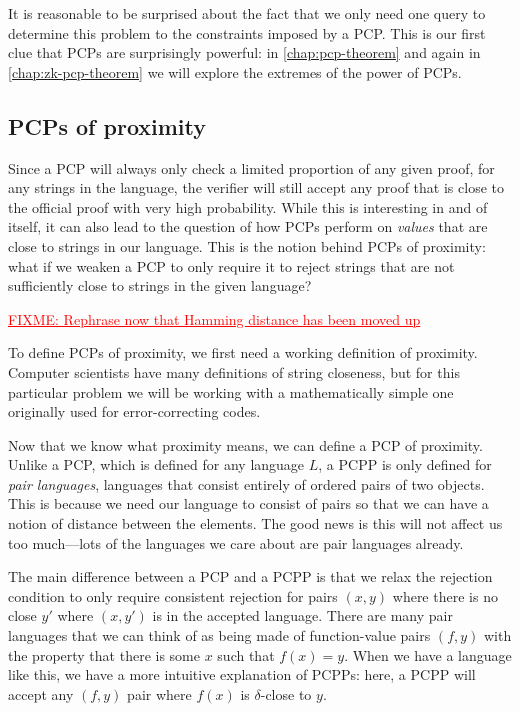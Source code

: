 \documentclass[english,12pt]{reedthesis}
\theoremstyle{plain}
\theoremstyle{definition}
\theoremstyle{remark}
\newcommand{\FIXME}[1]{\textcolor{red}{\ul{FIXME: #1}}}
\begin{document}
It is reasonable to be surprised about the fact that we only need one query to
determine this problem to the constraints imposed by a PCP\@. This is our first
clue that PCPs are surprisingly powerful: in \cref{chap:pcp-theorem} and again
in \cref{chap:zk-pcp-theorem} we will explore the extremes of the power of PCPs.

\subsection{PCPs of proximity}\label{sec:pcpp}

Since a PCP will always only check a limited proportion of any given proof, for
any strings in the language, the verifier will still accept any proof that is
close to the official proof with very high probability. While this is
interesting in and of itself, it can also lead to the question of how PCPs
perform on \emph{values} that are close to strings in our language. This is the
notion behind PCPs of proximity: what if we weaken a PCP to only require it to
reject strings that are not sufficiently close to strings in the given language?

\FIXME{Rephrase now that Hamming distance has been moved up}

To define PCPs of proximity, we first need a working definition of proximity.
Computer scientists have many definitions of string closeness, but for this
particular problem we will be working with a mathematically simple one
originally used for error-correcting codes.

Now that we know what proximity means, we can define a PCP of proximity. Unlike
a PCP, which is defined for any language $L$, a PCPP is only defined for
\emph{pair languages}, languages that consist entirely of
ordered pairs of two objects. This is because we need our language to consist of
pairs so that we can have a notion of distance between the elements. The good
news is this will not affect us too much---lots of the languages we care about are
pair languages already.

The main difference between a PCP and a PCPP is that we relax the rejection
condition to only require consistent rejection for pairs $(x, y)$ where there is
no close $y'$ where $(x, y')$ is in the accepted language. There are many pair
languages that we can think of as being made of function-value pairs $(f, y)$
with the property that there is some $x$ such that $f(x) = y$. When we have a
language like this, we have a more intuitive explanation of PCPPs: here, a PCPP
will accept any $(f, y)$ pair where $f(x)$ is $\delta$-close to $y$.
\end{document}
